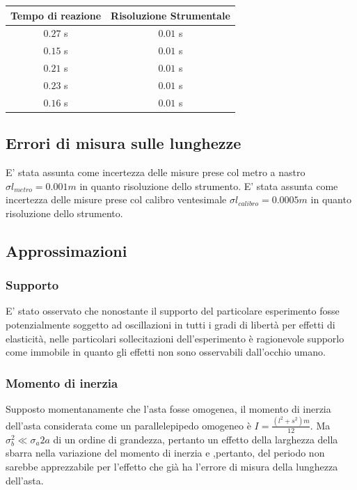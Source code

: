\documentclass[11pt]{article}
\begin{document}
\begin{table} 
\centering
\begin{tabular}{|c|c|}
 
\hline
  Tempo di reazione & Risoluzione Strumentale \\
  \hline
  $0.27 $ s & $0.01$ s \\
  $0.15$ s & $0.01$ s \\
  $0.21$ s & $0.01$ s \\
  $0.23$ s & $0.01$ s \\
  $0.16$ s & $0.01$ s \\
  \hline

\end{tabular}
\end{table}




\subsection{Errori di misura sulle lunghezze}
E' stata assunta come incertezza delle misure prese col metro a nastro $\sigma l_{metro}=0.001 m$ in quanto risoluzione dello strumento.
E' stata assunta come incertezza delle misure prese col calibro ventesimale $\sigma l_{calibro}=0.0005 m$ in quanto risoluzione dello strumento.
\subsection{Approssimazioni}
\subsubsection{Supporto}
E' stato osservato che nonostante il supporto del particolare esperimento fosse potenzialmente soggetto ad oscillazioni in tutti i gradi di libertà per effetti di elasticità, nelle particolari sollecitazioni dell'esperimento è ragionevole supporlo come immobile in quanto gli effetti non sono osservabili dall'occhio umano.
\subsubsection{Momento di inerzia}
Supposto momentanamente che l'asta fosse omogenea, il momento di inerzia dell'asta considerata come un parallelepipedo omogeneo è $I=\frac{(l^2+s^2)m}{12}$.
Ma $\sigma_b ^2 \ll \sigma_a 2a$ di un ordine di grandezza, pertanto un effetto della larghezza della sbarra nella variazione del momento di inerzia e ,pertanto, del periodo non sarebbe apprezzabile per l'effetto che già ha l'errore di misura della lunghezza dell'asta.
\end{document}
